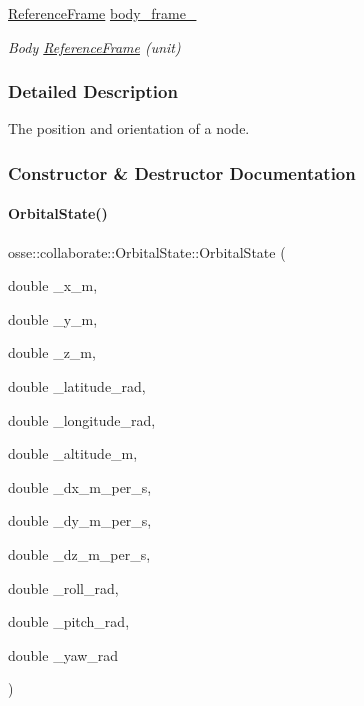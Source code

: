 \begin{DoxyCompactItemize}
\mbox{\label{classosse_1_1collaborate_1_1_orbital_state_a3542ba071a7a50da3974a5766b089d58}} 
\hyperlink{classosse_1_1collaborate_1_1_reference_frame}{Reference\+Frame} \hyperlink{classosse_1_1collaborate_1_1_orbital_state_a3542ba071a7a50da3974a5766b089d58}{body\+\_\+frame\+\_\+}
\begin{DoxyCompactList}\small\item\em Body \hyperlink{classosse_1_1collaborate_1_1_reference_frame}{Reference\+Frame} (unit) \end{DoxyCompactList}\end{DoxyCompactItemize}


\subsubsection{Detailed Description}
The position and orientation of a node. 

\subsubsection{Constructor \& Destructor Documentation}
\mbox{\label{classosse_1_1collaborate_1_1_orbital_state_a9990f1fc348981b44c1a9c7781cb9b4f}} 
\paragraph{\texorpdfstring{Orbital\+State()}{OrbitalState()}}
{\footnotesize\ttfamily osse\+::collaborate\+::\+Orbital\+State\+::\+Orbital\+State (\begin{DoxyParamCaption}\item[{double}]{\+\_\+x\+\_\+m,  }\item[{double}]{\+\_\+y\+\_\+m,  }\item[{double}]{\+\_\+z\+\_\+m,  }\item[{double}]{\+\_\+latitude\+\_\+rad,  }\item[{double}]{\+\_\+longitude\+\_\+rad,  }\item[{double}]{\+\_\+altitude\+\_\+m,  }\item[{double}]{\+\_\+dx\+\_\+m\+\_\+per\+\_\+s,  }\item[{double}]{\+\_\+dy\+\_\+m\+\_\+per\+\_\+s,  }\item[{double}]{\+\_\+dz\+\_\+m\+\_\+per\+\_\+s,  }\item[{double}]{\+\_\+roll\+\_\+rad,  }\item[{double}]{\+\_\+pitch\+\_\+rad,  }\item[{double}]{\+\_\+yaw\+\_\+rad }\end{DoxyParamCaption})}




